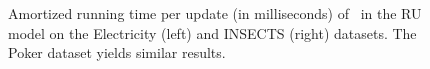 \begin{figure}
\vspace*{10pt}
    \centering
    \hfill

\caption{Amortized running time per update (in milliseconds) of \algo\ in the RU model on the Electricity (left) and INSECTS (right) datasets. The Poker dataset yields similar results.}

\label{fig:RU}
\end{figure}




